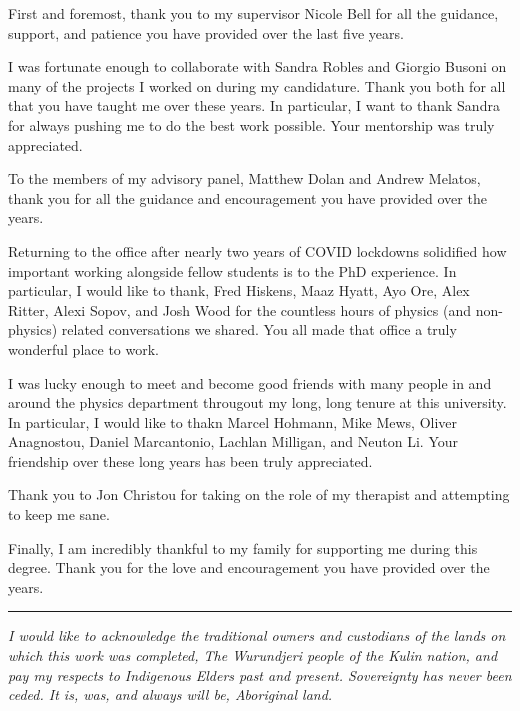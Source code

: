 \begin{acknowledgements}

  First and foremost, thank you to my supervisor Nicole Bell for all the guidance, support, and patience you have provided over the last five years. 

  I was fortunate enough to collaborate with Sandra Robles and Giorgio Busoni on many of the projects I worked on during my candidature. Thank you both for all that you have taught me over these years. In particular, I want to thank Sandra for always pushing me to do the best work possible. Your mentorship was truly appreciated.

  To the members of my advisory panel, Matthew Dolan and Andrew Melatos, thank you for all the guidance and encouragement you have provided over the years.

  Returning to the office after nearly two years of COVID lockdowns solidified how important working alongside fellow students is to the PhD experience. In particular, I would like to thank, Fred Hiskens, Maaz Hyatt, Ayo Ore, Alex Ritter, Alexi Sopov, and Josh Wood for the countless hours of physics (and non-physics) related conversations we shared. You all made that office a truly wonderful place to work.
 
  I was lucky enough to meet and become good friends with many people in and around the physics department througout my long, long tenure at this university. In particular, I would like to thakn Marcel Hohmann, Mike Mews, Oliver Anagnostou, Daniel Marcantonio, Lachlan Milligan, and Neuton Li. Your friendship over these long years has been truly appreciated.

  Thank you to Jon Christou for taking on the role of my therapist and attempting to keep me sane. 

  Finally, I am incredibly thankful to my family for supporting me during this degree. Thank you for the love and encouragement you have provided over the years. 

  \vfill
  \noindent\rule{\textwidth}{0.5pt}
  \textit{I would like to acknowledge the traditional owners and custodians of the lands on which this work was completed, The Wurundjeri people of the Kulin nation, and pay my respects to Indigenous Elders past and present. Sovereignty has never been ceded. It is, was, and always will be, Aboriginal land.}
\end{acknowledgements}
